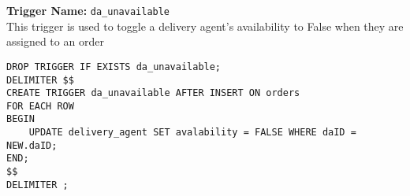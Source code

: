 \textbf{Trigger Name:} \texttt{da\_unavailable} \\
This trigger is used to toggle a delivery agent's availability to False when they are assigned to an order

\begin{lstlisting}
DROP TRIGGER IF EXISTS da_unavailable;
DELIMITER $$
CREATE TRIGGER da_unavailable AFTER INSERT ON orders
FOR EACH ROW
BEGIN
    UPDATE delivery_agent SET avalability = FALSE WHERE daID = NEW.daID;
END;
$$
DELIMITER ;
\end{lstlisting}